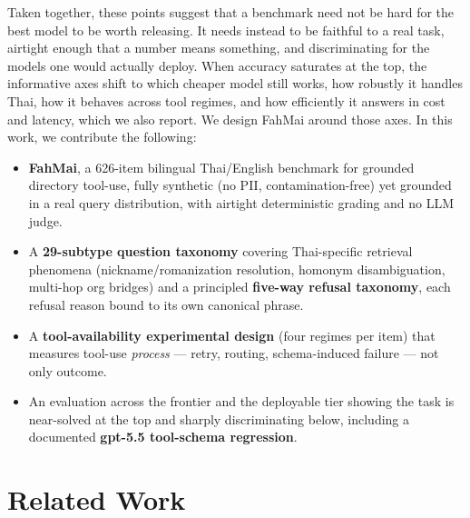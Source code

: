 \documentclass[11pt]{article}
\begin{document}
Taken together, these points suggest that a benchmark need not be hard for the best model to be worth
releasing. It needs instead to be faithful to a real task, airtight enough that a number means
something, and discriminating for the models one would actually deploy. When accuracy saturates at the
top, the informative axes shift to which cheaper model still works, how robustly it handles Thai, how
it behaves across tool regimes, and how efficiently it answers in cost and latency, which we also
report. We design FahMai around those axes. In this work, we contribute the following:

\begin{itemize}
\item \textbf{FahMai}, a 626-item bilingual Thai/English benchmark for grounded directory tool-use,
fully synthetic (no PII, contamination-free) yet grounded in a real query distribution, with airtight
deterministic grading and no LLM judge.
\item A \textbf{29-subtype question taxonomy} covering Thai-specific retrieval phenomena
(nickname/romanization resolution, homonym disambiguation, multi-hop org bridges) and a principled
\textbf{five-way refusal taxonomy}, each refusal reason bound to its own canonical phrase.
\item A \textbf{tool-availability experimental design} (four regimes per item) that measures tool-use
\emph{process} --- retry, routing, schema-induced failure --- not only outcome.
\item An evaluation across the frontier and the deployable tier showing the task is near-solved at the
top and sharply discriminating below, including a documented \textbf{gpt-5.5 tool-schema regression}.
\end{itemize}

\section{Related Work}
\end{document}
